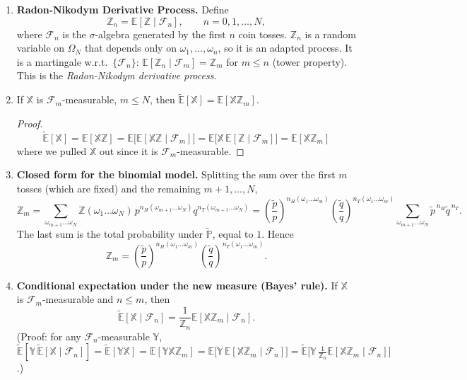 \begin{enumerate}
    \item \textbf{Radon-Nikodym Derivative Process.} Define
    \[\mathbb{Z}_n = \mathbb{E}[\mathbb{Z} \mid \mathcal{F}_n], \qquad n = 0, 1, \dots, N,\]
    where $\mathcal{F}_n$ is the $\sigma$-algebra generated by the first $n$ coin tosses. $\mathbb{Z}_n$ is a random variable on $\Omega_N$ that depends only on $\omega_1, \dots, \omega_n$, so it is an adapted process. It is a martingale w.r.t.\ $\{\mathcal{F}_n\}$: $\mathbb{E}[\mathbb{Z}_n \mid \mathcal{F}_m] = \mathbb{Z}_m$ for $m \leq n$ (tower property). This is the \textit{Radon-Nikodym derivative process}.

    \item If $\mathbb{X}$ is $\mathcal{F}_m$-measurable, $m \leq N$, then $\tilde{\mathbb{E}}[\mathbb{X}] = \mathbb{E}[\mathbb{X}\mathbb{Z}_m]$.
    \begin{proof}
        $$\tilde{\mathbb{E}}[\mathbb{X}] = \mathbb{E}[\mathbb{X}\mathbb{Z}] = \mathbb{E}\bigl[\mathbb{E}[\mathbb{X}\mathbb{Z} \mid \mathcal{F}_m]\bigr] = \mathbb{E}\bigl[\mathbb{X}\,\mathbb{E}[\mathbb{Z} \mid \mathcal{F}_m]\bigr] = \mathbb{E}[\mathbb{X}\mathbb{Z}_m]$$
        where we pulled $\mathbb{X}$ out since it is $\mathcal{F}_m$-measurable.
    \end{proof}

    \item \textbf{Closed form for the binomial model.} Splitting the sum over the first $m$ tosses (which are fixed) and the remaining $m+1, \dots, N$,
    \[\mathbb{Z}_m = \sum_{\omega_{m+1}\dots\omega_N}\mathbb{Z}(\omega_1 \dots \omega_N)\,p^{n_H(\omega_{m+1}\dots\omega_N)}q^{n_T(\omega_{m+1}\dots\omega_N)} = \left(\frac{\tilde{p}}{p}\right)^{n_H(\omega_1\dots\omega_m)}\left(\frac{\tilde{q}}{q}\right)^{n_T(\omega_1\dots\omega_m)}\sum_{\omega_{m+1}\dots\omega_N}\tilde{p}^{\,n_H}\tilde{q}^{\,n_T}.\]
    The last sum is the total probability under $\tilde{\mathbb{P}}$, equal to $1$. Hence
    \[\mathbb{Z}_m = \left(\frac{\tilde{p}}{p}\right)^{n_H(\omega_1\dots\omega_m)}\left(\frac{\tilde{q}}{q}\right)^{n_T(\omega_1\dots\omega_m)}.\]

    \item \textbf{Conditional expectation under the new measure (Bayes' rule).} If $\mathbb{X}$ is $\mathcal{F}_m$-measurable and $n \leq m$, then
    \[\tilde{\mathbb{E}}[\mathbb{X} \mid \mathcal{F}_n] = \frac{1}{\mathbb{Z}_n}\mathbb{E}[\mathbb{X}\mathbb{Z}_m \mid \mathcal{F}_n]. \tag{$\clubsuit$}\]
    (Proof: for any $\mathcal{F}_n$-measurable $\mathbb{Y}$, $\tilde{\mathbb{E}}[\mathbb{Y}\,\tilde{\mathbb{E}}[\mathbb{X}\mid\mathcal{F}_n]] = \tilde{\mathbb{E}}[\mathbb{Y}\mathbb{X}] = \mathbb{E}[\mathbb{Y}\mathbb{X}\mathbb{Z}_m] = \mathbb{E}\bigl[\mathbb{Y}\,\mathbb{E}[\mathbb{X}\mathbb{Z}_m\mid\mathcal{F}_n]\bigr] = \tilde{\mathbb{E}}\bigl[\mathbb{Y}\,\tfrac{1}{\mathbb{Z}_n}\mathbb{E}[\mathbb{X}\mathbb{Z}_m\mid\mathcal{F}_n]\bigr]$.)


\end{enumerate}
